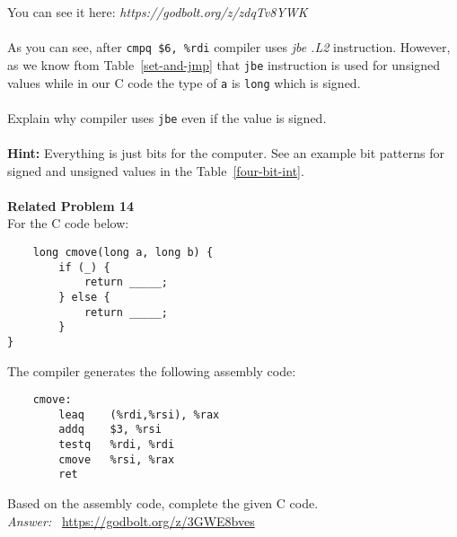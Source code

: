 You can see it here: \textit{https://godbolt.org/z/zdqTv8YWK} \\
\\
As you can see, after \texttt{cmpq \$6, \%rdi} compiler uses \textit{jbe    .L2} 
instruction.  However, as we know ftom Table~\ref{set-and-jmp} that \texttt{jbe} instruction 
is used for unsigned values while in our C code the type of \texttt{a} is \texttt{long} which 
is signed. \\
\\
Explain why compiler uses \texttt{jbe} even if the value is signed. \\
\\
\textbf{Hint:} Everything is just bits for the computer. See an example bit 
patterns for signed and unsigned values in the Table~\ref{four-bit-int}. \\
\\
\noindent\textbf{Related Problem 14} \\
For the C code below:
\begin{verbatim}
    long cmove(long a, long b) {
        if (_) {
            return _____;
        } else {
            return _____;
        }
}
\end{verbatim}
The compiler generates the following assembly code: 
\begin{verbatim}
    cmove:
        leaq    (%rdi,%rsi), %rax
        addq    $3, %rsi
        testq   %rdi, %rdi
        cmove   %rsi, %rax
        ret
\end{verbatim}
Based on the assembly code, complete the given C code. \\

\noindent\textit{Answer: }~\url{https://godbolt.org/z/3GWE8bves} \\
